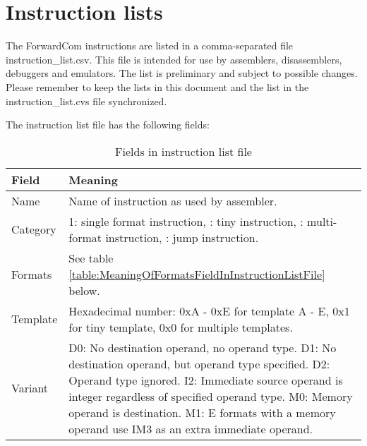 \documentclass[forwardcom.tex]{subfiles}
\begin{document}
\RaggedRight

\chapter{Instruction lists}
The ForwardCom instructions are listed in a comma-separated file instruction\_list.csv. This file is intended for use by assemblers, disassemblers, debuggers and emulators. The list is preliminary and subject to possible changes. Please remember to keep the lists in this document and the list in the instruction\_list.cvs file synchronized.
\vspace{2mm}

The instruction list file has the following fields:

\begin{longtable} {|p{18mm}|p{100mm}|}
\caption{Fields in instruction list file} 
\label{table:fieldsInInstructionListFile}
\\
\endfirsthead
\endhead
\hline
\bfseries Field & \bfseries Meaning  \\
\hline
Name & Name of instruction as used by assembler.  \\
\hline
Category & 1: single format instruction, \newline
           2: tiny instruction,  \newline
           3: multi-format instruction,  \newline
           4: jump instruction. \\
\hline
Formats & See table \ref{table:MeaningOfFormatsFieldInInstructionListFile} below.  \\
\hline
Template & Hexadecimal number:  \newline
           0xA - 0xE for template A - E,  \newline
           0x1 for tiny template,  \newline
           0x0 for multiple templates. \\
\hline
Variant & 
D0:  No destination operand, no operand type.\newline
D1:  No destination operand, but operand type specified.\newline
D2:  Operand type ignored.\newline
I2:  Immediate source operand is integer regardless of specified operand type.\newline
M0:  Memory operand is destination.\newline
M1:  E formats with a memory operand use IM3 as an extra immediate operand.\newline

\end{longtable}
\end{document}
